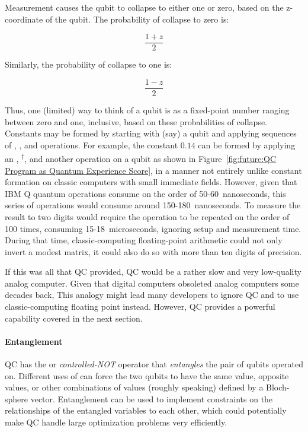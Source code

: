 Measurement causes the qubit to collapse to either one or zero, based
on the z-coordinate of the qubit.
The probability of collapse to zero is:

\begin{equation}
	\frac{1+z}{2}
\end{equation}

Similarly, the probability of collapse to one is:

\begin{equation}
	\frac{1-z}{2}
\end{equation}

Thus, one (limited) way to think of a qubit is as a fixed-point number
ranging between zero and one, inclusive, based on these probabilities
of collapse.
Constants may be formed by starting with (say) a  qubit and
applying sequences of , , and  operations.
For example, the constant $0.14$ can be formed by applying an
, \textsuperscript{$\dagger$}, and another 
operation on a  qubit as shown in
Figure~\ref{fig:future:QC Program as Quantum Experience Score},
in a manner not entirely unlike constant formation on classic
computers with small immediate fields.
However, given that IBM Q quantum operations consume on the
order of 50-60~nanoseconds, this series of operations would
consume around 150-180~nanoseconds.
To measure the result to two digits would require the operation to
be repeated on the order of 100 times, consuming 15-18~microseconds,
ignoring setup and measurement time.
During that time, classic-computing floating-point arithmetic could not
only invert a modest matrix, it could also do so with more than
ten digits of precision.

If this was all that QC provided, QC would be a rather slow and very
low-quality analog computer.
Given that digital computers obsoleted analog computers some decades back,
This analogy might lead many developers to ignore QC and to
use classic-computing floating point instead.
However, QC provides a powerful capability covered in the next section.

\paragraph{Entanglement}

QC has the  or \emph{controlled-NOT} operator that
\emph{entangles} the pair of qubits operated on.
Different uses of  can force the two qubits to have the same
value, opposite values, or other combinations of values (roughly speaking)
defined by a Bloch-sphere vector.
Entanglement can be used to implement constraints
on the relationships of the entangled variables to each other, which
could potentially make QC handle large optimization problems very
efficiently.

